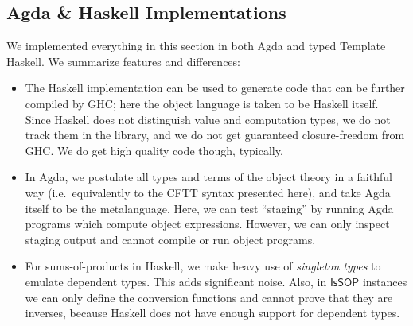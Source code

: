 \documentclass[acmsmall,screen,review,anonymous]{acmart}
\newcommand{\msf}[1]{{\mathsf{#1}}}
\newcommand{\IsSOP}{\msf{IsSOP}}
\theoremstyle{remark}
\begin{document}
\subsection{Agda \& Haskell Implementations}

We implemented everything in this section in both Agda and typed Template
Haskell. We summarize features and differences:
\begin{itemize}
\item The Haskell implementation can be used to generate code that can be
      further compiled by GHC; here the object language is taken to be Haskell
      itself. Since Haskell does not distinguish value and computation types, we do
      not track them in the library, and we do not get guaranteed closure-freedom
      from GHC. We do get high quality code though, typically.
\item In Agda, we postulate all types and terms of the object theory in a
  faithful way (i.e.\ equivalently to the CFTT syntax presented here), and take
  Agda itself to be the metalanguage. Here, we can test ``staging'' by running Agda
  programs which compute object expressions. However, we can only inspect
  staging output and cannot compile or run object programs.
\item For sums-of-products in Haskell, we make heavy use of \emph{singleton
  types} \cite{TODO} to emulate dependent types. This adds significant
  noise. Also, in $\IsSOP$ instances we can only define the conversion functions
  and cannot prove that they are inverses, because Haskell does not have enough support
  for dependent types.
\end{itemize}
\end{document}

